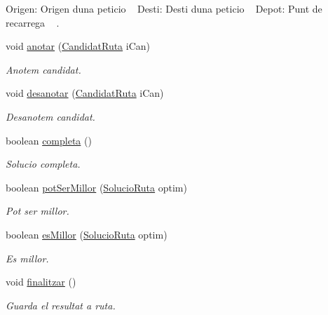 \begin{DoxyCompactItemize}
\begin{DoxyCompactList}
 Origen\+: Origen d\textquotesingle{}una peticio ~\newline
Desti\+: Desti d\textquotesingle{}una peticio ~\newline
Depot\+: Punt de recarrega ~\newline
. \end{DoxyCompactList}\item 
void \hyperlink{class_portam_a_pro_p_1_1_solucio_ruta_a616aa2104765f1218a426944ec1695b6}{anotar} (\hyperlink{class_portam_a_pro_p_1_1_candidat_ruta}{Candidat\+Ruta} i\+Can)
\begin{DoxyCompactList}\small\item\em Anotem candidat. \end{DoxyCompactList}\item 
void \hyperlink{class_portam_a_pro_p_1_1_solucio_ruta_a84464a58a4c68efa9f332b94f7349c42}{desanotar} (\hyperlink{class_portam_a_pro_p_1_1_candidat_ruta}{Candidat\+Ruta} i\+Can)
\begin{DoxyCompactList}\small\item\em Desanotem candidat. \end{DoxyCompactList}\item 
boolean \hyperlink{class_portam_a_pro_p_1_1_solucio_ruta_ab949eba660c769bf69e80decac453da4}{completa} ()
\begin{DoxyCompactList}\small\item\em Solucio completa. \end{DoxyCompactList}\item 
boolean \hyperlink{class_portam_a_pro_p_1_1_solucio_ruta_adda943e292f59567d947a45725892480}{pot\+Ser\+Millor} (\hyperlink{class_portam_a_pro_p_1_1_solucio_ruta}{Solucio\+Ruta} optim)
\begin{DoxyCompactList}\small\item\em Pot ser millor. \end{DoxyCompactList}\item 
boolean \hyperlink{class_portam_a_pro_p_1_1_solucio_ruta_aefcddb3e0a49950f99007c52d5845cdc}{es\+Millor} (\hyperlink{class_portam_a_pro_p_1_1_solucio_ruta}{Solucio\+Ruta} optim)
\begin{DoxyCompactList}\small\item\em Es millor. \end{DoxyCompactList}\item 
void \hyperlink{class_portam_a_pro_p_1_1_solucio_ruta_aaf3d50166e85a38269d39b9f7bde1a83}{finalitzar} ()
\begin{DoxyCompactList}\small\item\em Guarda el resultat a ruta. \end{DoxyCompactList}\end{DoxyCompactItemize}


